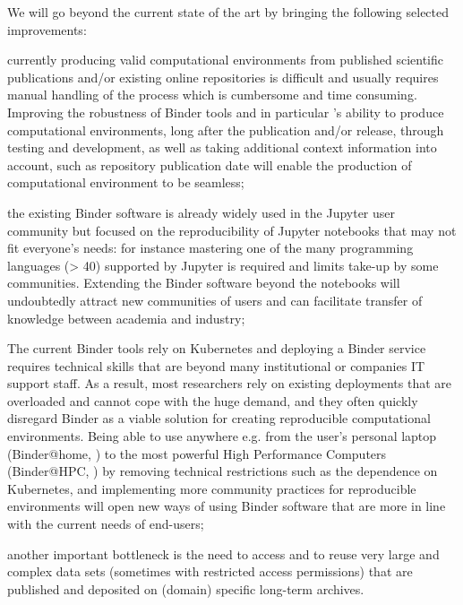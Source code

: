 We will go beyond the current state of the art by bringing the following selected improvements:
\begin{compactitem}
\item currently producing valid computational environments from published scientific publications and/or existing
      online repositories is difficult and usually requires manual handling of the process which is cumbersome and
      time consuming. Improving the robustness of Binder tools and in particular \repotodocker{}'s ability to
      produce computational environments, long after the publication and/or release,
      through testing and development, as well as taking additional context information into account,
      such as repository publication date will enable the production of computational environment to be seamless;
\item the existing Binder software is already widely used in the Jupyter user community but focused on the
      reproducibility of Jupyter notebooks that may not fit everyone’s needs: for instance mastering one of the many
      programming languages (> 40) supported by Jupyter is required and limits take-up by some communities. Extending
      the Binder software beyond the notebooks will undoubtedly attract new communities of users and can facilitate
      transfer of knowledge between academia and industry;
\item The current Binder tools rely on Kubernetes and deploying a Binder service requires technical skills that are
      beyond many institutional or companies IT support staff. As a result, most researchers rely on existing
      deployments that are overloaded and cannot cope with the huge demand, and they often quickly disregard Binder
      as a viable solution for creating reproducible computational environments. Being able to use \repotodocker{}
      anywhere e.g. from the user’s personal laptop (Binder@home, ) to the
      most powerful High Performance Computers (Binder@HPC, ) by removing technical restrictions such as the dependence on Kubernetes, and implementing more community practices for reproducible environments will open new ways of using Binder software that are more in line with the current needs of end-users;
\item another important bottleneck is the need to access and to reuse very large and complex data sets (sometimes
      with restricted access permissions) that are published and deposited on (domain) specific long-term archives.

\end{compactitem}
